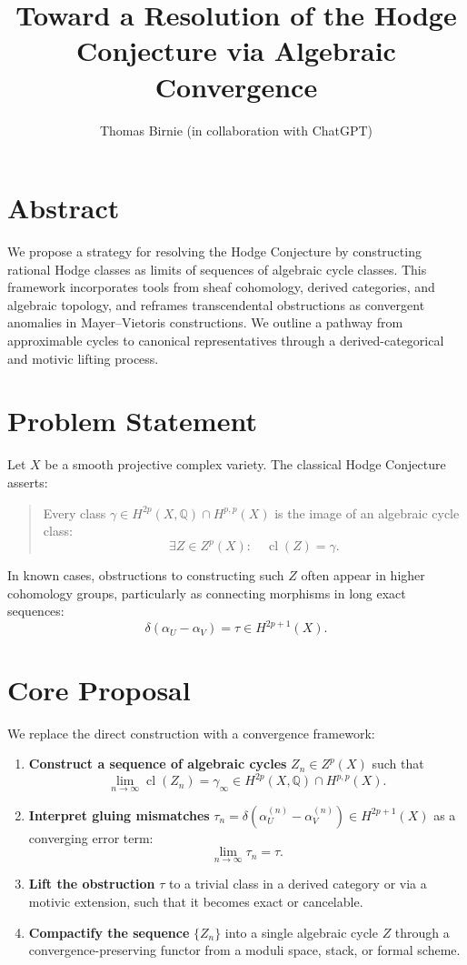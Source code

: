 \documentclass[12pt]{article}
\title{Toward a Resolution of the Hodge Conjecture via Algebraic Convergence}
\author{Thomas Birnie (in collaboration with ChatGPT)}
\date{}
\begin{document}
\maketitle

\section*{Abstract}
We propose a strategy for resolving the Hodge Conjecture by constructing rational Hodge classes as limits of sequences of algebraic cycle classes. This framework incorporates tools from sheaf cohomology, derived categories, and algebraic topology, and reframes transcendental obstructions as convergent anomalies in Mayer–Vietoris constructions. We outline a pathway from approximable cycles to canonical representatives through a derived-categorical and motivic lifting process.

\section{Problem Statement}
Let \( X \) be a smooth projective complex variety. The classical Hodge Conjecture asserts:
\begin{quote}
Every class \( \gamma \in H^{2p}(X, \mathbb{Q}) \cap H^{p,p}(X) \) is the image of an algebraic cycle class:
\[
\exists Z \in Z^p(X): \quad \operatorname{cl}(Z) = \gamma.
\]
\end{quote}

In known cases, obstructions to constructing such \( Z \) often appear in higher cohomology groups, particularly as connecting morphisms in long exact sequences:
\[
\delta(\alpha_U - \alpha_V) = \tau \in H^{2p+1}(X).
\]

\section{Core Proposal}
We replace the direct construction with a convergence framework:
\begin{enumerate}
    \item \textbf{Construct a sequence of algebraic cycles} \( Z_n \in Z^p(X) \) such that
    \[
    \lim_{n \to \infty} \operatorname{cl}(Z_n) = \gamma_\infty \in H^{2p}(X, \mathbb{Q}) \cap H^{p,p}(X).
    \]
    \item \textbf{Interpret gluing mismatches} \( \tau_n = \delta(\alpha_U^{(n)} - \alpha_V^{(n)}) \in H^{2p+1}(X) \) as a converging error term:
    \[
    \lim_{n \to \infty} \tau_n = \tau.
    \]
    \item \textbf{Lift the obstruction} \( \tau \) to a trivial class in a derived category or via a motivic extension, such that it becomes exact or cancelable.
    \item \textbf{Compactify the sequence} \( \{Z_n\} \) into a single algebraic cycle \( Z \) through a convergence-preserving functor from a moduli space, stack, or formal scheme.
\end{enumerate}
\end{document}
